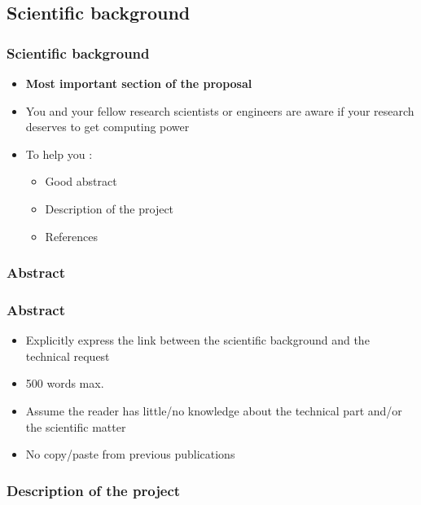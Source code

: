 \subsection{Scientific background}

\begin{frame}[containsverbatim]
	\frametitle{Scientific background}
\begin{itemize}
	\item{\textbf{Most important section of the proposal}}
	\item{You and your fellow research scientists or engineers are aware if your research deserves to get computing power}
	\item{To help you : 
	\begin{itemize}
		\item{Good abstract}
		\item{Description of the project}
		\item{References}
	\end{itemize}
	}
\end{itemize}
\end{frame}


\subsubsection{Abstract}

\begin{frame}[containsverbatim]
	\frametitle{Abstract}

\begin{itemize}
	\item{\textcolor{dkgreen}{ Explicitly express the link between the scientific background and the technical request}}
	\item{\textcolor{dkgreen}{ 500 words max. } }
	\item{\textcolor{dkgreen}{ Assume the reader has little/no knowledge about the technical part and/or the scientific matter} }
	
	\item{\textcolor{dkred}{No copy/paste from previous publications}}
\end{itemize}
\end{frame}


\subsubsection{Description of the project}

